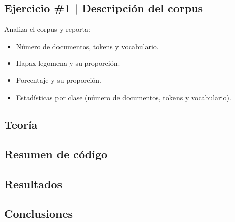\newpage

\begin{myblock}
\section*{Ejercicio \#1 | Descripción del corpus}

Analiza el corpus y reporta:\\

\begin{itemize}
    \item Número de documentos, tokens y vocabulario.
    \item Hapax legomena y su proporción.
    \item Porcentaje y su proporción.
    \item Estadísticas por clase (número de documentos, tokens y vocabulario).
\end{itemize}

\end{myblock}



\subsection{Teoría}

\subsection{Resumen de código}

\subsection{Resultados}

\subsection{Conclusiones}

\clearpage










